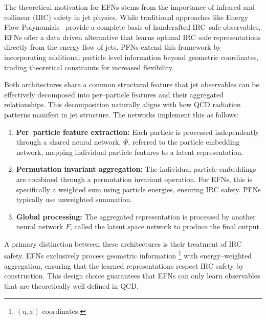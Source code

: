         The theoretical motivation for EFNs stems from the importance of infrared and collinear (IRC) safety in jet physics.
        While traditional approaches like Energy Flow Polynomials~\cite{Komiske2018EnergySubstructure} provide a complete basis of handcrafted IRC--safe observables, EFNs offer a data driven alternative that learns optimal IRC--safe representations directly from the energy flow of jets.
        PFNs extend this framework by incorporating additional particle level information beyond geometric coordinates, trading theoretical constraints for increased flexibility.
        
        Both architectures share a common structural feature that jet observables can be effectively decomposed into per--particle features and their aggregated relationships.
        This decomposition naturally aligns with how QCD radiation patterns manifest in jet structure.
        The networks implement this as follows:
        \begin{enumerate}
            \item \textbf{Per--particle feature extraction:}
                Each particle is processed independently through a shared neural network, \(\Phi\), referred to the particle embedding network, mapping individual particle features to a latent representation.
            \item \textbf{Permutation invariant aggregation:}
                The individual particle embeddings are combined through a permutation invariant operation.
                For EFNs, this is specifically a weighted sum using particle energies, ensuring IRC safety.
                PFNs typically use unweighted summation.
            \item \textbf{Global processing:}
                The aggregated representation is processed by another neural network \(F\), called the latent space network to produce the final output.
        \end{enumerate}
        
        A primary distinction between these architectures is their treatment of IRC safety.
        EFNs exclusively process geometric information \footnote{\((\eta,\phi)\) coordinates.} with energy--weighted aggregation, ensuring that the learned representations respect IRC safety by construction.
        This design choice guarantees that EFNs can only learn observables that are theoretically well defined in QCD.
        
